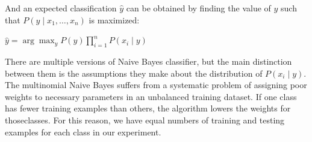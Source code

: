 And an expected classification $\hat{y}$ can be obtained by finding the value of $y$ such that $P(y \mid x_1, \dots, x_n)$ is maximized:
\begin{center}
$\hat{y} = \arg\max_y P(y) \prod_{i=1}^{n} P(x_i \mid y)$
\end{center}
There are multiple versions of Naive Bayes classifier, but the main distinction between them is the assumptions they make about the distribution of $P(x_i \mid y)$\cite{scikit-learn}. The multinomial Naive Bayes suffers from a systematic problem of assigning poor weights to necessary parameters in an unbalanced training dataset. If one class has fewer training examples than others, the algorithm lowers the weights for thoseclasses\cite{rennie2003tackling}. For this reason, we have equal numbers of training and testing examples for each class in our experiment. 

